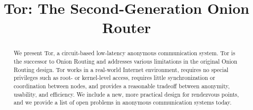 \documentclass[times,10pt,twocolumn]{article}
\begin{document}

\title{Tor: The Second-Generation Onion Router}


\maketitle
\thispagestyle{empty}

\begin{abstract}
We present Tor, a circuit-based low-latency anonymous communication
system. Tor is the successor to Onion Routing
and addresses various limitations in the original Onion Routing design.
Tor works in a real-world Internet environment, requires no special
privileges such as root- or kernel-level access,
requires little synchronization or coordination between nodes, and
provides a reasonable tradeoff between anonymity, usability, and efficiency.
We include a new, more practical design for rendezvous points, and we
provide a list of open problems in anonymous communication systems today.
\end{abstract}



\label{sec:intro}
\end{document}
